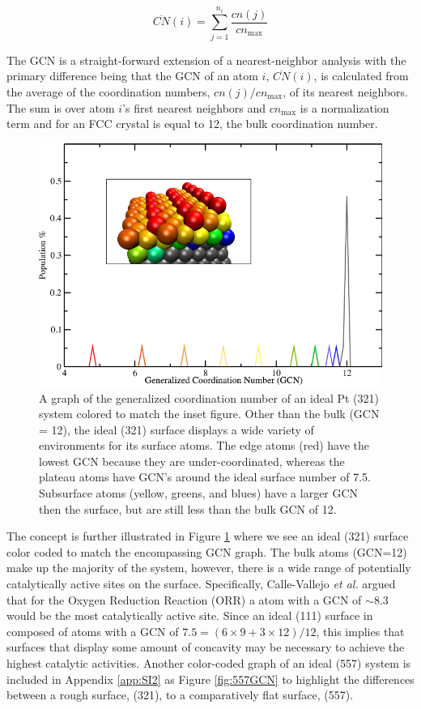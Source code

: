 \begin{equation}
  \overline{CN}(i) = \sum_{j=1}^{n_i}\frac{cn(j)}{cn_{\textrm{max}}}
  \label{eq:gcn}
\end{equation}

The GCN is a straight-forward extension of a nearest-neighbor analysis with the
primary difference being that the GCN of an atom $i$, $\overline{CN}(i)$,  is
calculated from the average of the coordination numbers, $cn(j)/cn_\textrm{max}$,
of its nearest neighbors.  The sum is over atom $i$'s first nearest neighbors
and $cn_\textrm{max}$ is a normalization term and for an FCC crystal is equal
to 12, the bulk coordination number.

\begin{figure}[p!]
  \includegraphics[width=\linewidth]{../figures/chap4/321_ideal_gcn.pdf}
  \caption{A graph of the generalized coordination number of an ideal Pt (321)
system colored to match the inset figure. Other than the bulk (GCN = 12), the
ideal (321) surface displays a wide variety of environments for its surface
atoms.  The edge atoms (red) have the lowest GCN because they are 
under-coordinated, whereas the plateau atoms have GCN's around the ideal
surface number of 7.5. Subsurface atoms (yellow, greens, and blues) have a
larger GCN then the surface, but are still less than the bulk GCN of 12.  }
\label{fig:ideal321GCN}
\end{figure}

The concept is further illustrated in Figure \ref{fig:ideal321GCN} where we see
an ideal  (321) surface color coded to match the encompassing GCN graph.
The bulk atoms (GCN=12) make up the majority of the system, however, there is a
wide range of potentially catalytically active sites on the surface.
Specifically, Calle-Vallejo {\em et al.} argued that for the Oxygen Reduction
Reaction (ORR) a  atom with a GCN of $\sim$8.3 would be the most
catalytically active site. Since an ideal (111) surface in composed of atoms
with a GCN of $7.5=(6\times9 + 3\times12)/12$, this implies that surfaces that
display some amount of concavity may be necessary to achieve the highest
catalytic activities. Another color-coded graph of an ideal  (557)
system is included in Appendix \ref{app:SI2} as Figure \ref{fig:557GCN} to
highlight the differences between a rough surface, (321), to a comparatively
flat surface, (557).

